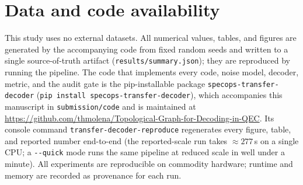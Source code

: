 \documentclass[reprint,aps,prxquantum,amsmath,amssymb,floatfix,nofootinbib,longbibliography]{revtex4-2}
\theoremstyle{definition}
\theoremstyle{remark}
\theoremstyle{plain}
\newcommand{\sync}[1]{#1}
\begin{document}
\section*{Data and code availability}
This study uses no external datasets. All numerical values, tables, and figures are generated by the accompanying code from fixed random seeds and written to a single source-of-truth artifact (\texttt{results/summary.json}); they are reproduced by running the pipeline. The code that implements every code, noise model, decoder, metric, and the audit gate is the pip-installable package \texttt{specops-transfer-decoder} (\texttt{pip install specops-transfer-decoder}), which accompanies this manuscript in \texttt{submission/code} and is maintained at \url{https://github.com/thmolena/Topological-Graph-for-Decoding-in-QEC}. Its console command \texttt{transfer-decoder-reproduce} regenerates every figure, table, and reported number end-to-end (the reported-scale run takes $\approx\sync{277}$\,s on a single CPU; a \texttt{-{}-quick} mode runs the same pipeline at reduced scale in well under a minute). All experiments are reproducible on commodity hardware; runtime and memory are recorded as provenance for each run.
\end{document}

